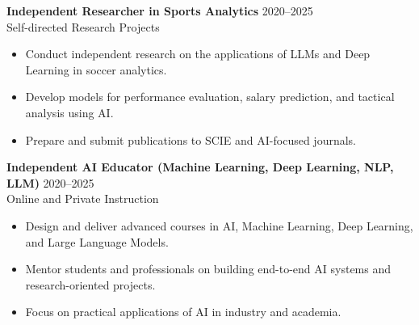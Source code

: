 \documentclass[11pt,a4paper]{article}
\begin{document}
\medskip

\textbf{Independent Researcher in Sports Analytics} \hfill 2020--2025 \\
Self-directed Research Projects
\begin{itemize}
    \item Conduct independent research on the applications of LLMs and Deep Learning in soccer
analytics.
    \item Develop models for performance evaluation, salary prediction, and tactical analysis using
AI.
    \item Prepare and submit publications to SCIE and AI-focused journals.
\end{itemize}

\medskip

\textbf{Independent AI Educator (Machine Learning, Deep Learning, NLP, LLM)} \hfill 2020--2025 \\
Online and Private Instruction
\begin{itemize}
    \item Design and deliver advanced courses in AI, Machine Learning, Deep Learning, and Large
Language Models.
    \item Mentor students and professionals on building end-to-end AI systems and research-oriented
projects.
    \item Focus on practical applications of AI in industry and academia.
\end{itemize}

\medskip
\end{document}
